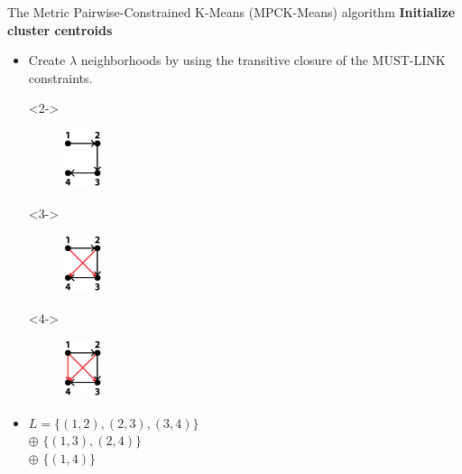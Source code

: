 \documentclass{beamer}
\newlength{\tmpShadow}
\newcommand{\MyShadow}[2]{%
	\settowidth{\tmpShadow}{#1}
	\addtolength{\tmpShadow}{.1em}
	\raisebox{-0.25ex}{\textcolor{gray!70}{#1}}%
	\kern-\tmpShadow%
	\textcolor{#2}{#1}%
}
\newcommand\tab[1][1cm]{\hspace*{#1}}
\begin{document}
{\begin{frame}{The Metric Pairwise-Constrained K-Means (MPCK-Means) algorithm}
	\textbf{Initialize cluster centroids}
	\vspace{4mm}
	\begin{itemize}[label={\MyShadow{$\bullet$}{blue!80}}]
		\item<1-> Create $\lambda$ neighborhoods by using the transitive closure of the MUST-LINK constraints.\tab\tab\tab\tab \textbf{\hyperlink{MPCKM}{}} %
	\end{itemize}
	\begin{multicols}{3}	
	\begin{itemize}
		\item[]<2-> 	
		\begin{figure}[H]
			\centering
			\includegraphics[width=0.1\textwidth]{figures/TransClos1}
		\end{figure}
		\item[]<3-> 	
		\begin{figure}[H]
			\centering
			\includegraphics[width=0.1\textwidth]{figures/TransClos2}
		\end{figure}
		\item[]<4-> 	
		\begin{figure}[H]
			\centering
			\includegraphics[width=0.1\textwidth]{figures/TransClos3}
		\end{figure}		
	\end{itemize}
	\end{multicols}
	\begin{itemize}[label={\MyShadow{$\rhd$}{blue!80}}]
		\item<5-> $L = \{(1,2),(2,3),(3,4)\}$\\ \tab$\oplus$ $\{(1,3),(2,4)\}$\\ \tab$\oplus$ $\{(1,4)\}$
	\end{itemize}
\end{frame}	

}
\end{document}
